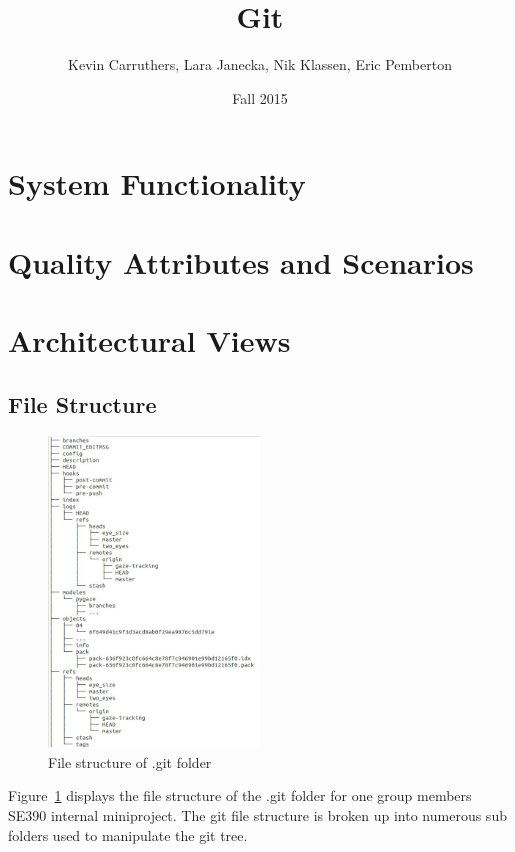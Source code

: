 \documentclass[12pt]{article}
\begin{document}
\title{Git}
\author{Kevin Carruthers, Lara Janecka, Nik Klassen, Eric Pemberton}
\date{\vspace{-2ex}Fall 2015}
\maketitle\HRule

\tableofcontents
\newpage

\section{System Functionality}

\section{Quality Attributes and Scenarios}

\section{Architectural Views}
\subsection{File Structure}
\begin{figure}[htbp]
\centering
\includegraphics[width=0.5\textwidth]{filestructure.jpeg}
\caption{File structure of .git folder}
\label{fig:file}
\end{figure}

Figure~\ref{fig:file} displays the file structure of the .git folder for one group members SE390 internal miniproject. The git file structure is broken up into numerous sub folders used to manipulate the git tree.
\end{document}
